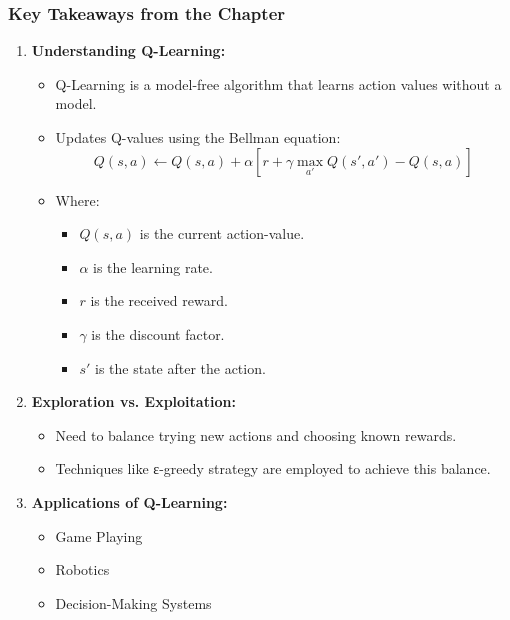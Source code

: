 \documentclass{beamer}
\begin{document}
\begin{frame}[fragile]
    \frametitle{Key Takeaways from the Chapter}
    \begin{enumerate}
        \item \textbf{Understanding Q-Learning:}
            \begin{itemize}
                \item Q-Learning is a model-free algorithm that learns action values without a model.
                \item Updates Q-values using the Bellman equation:
                \begin{equation}
                Q(s, a) \leftarrow Q(s, a) + \alpha \left[ r + \gamma \max_{a'} Q(s', a') - Q(s, a) \right]
                \end{equation}
                \item Where:
                \begin{itemize}
                    \item \(Q(s, a)\) is the current action-value.
                    \item \(\alpha\) is the learning rate.
                    \item \(r\) is the received reward.
                    \item \(\gamma\) is the discount factor.
                    \item \(s'\) is the state after the action.
                \end{itemize}
            \end{itemize}
        
        \item \textbf{Exploration vs. Exploitation:}
            \begin{itemize}
                \item Need to balance trying new actions and choosing known rewards.
                \item Techniques like ε-greedy strategy are employed to achieve this balance.
            \end{itemize}
        
        \item \textbf{Applications of Q-Learning:}
            \begin{itemize}
                \item Game Playing
                \item Robotics
                \item Decision-Making Systems
            \end{itemize}
    \end{enumerate}
\end{frame}
\end{document}
